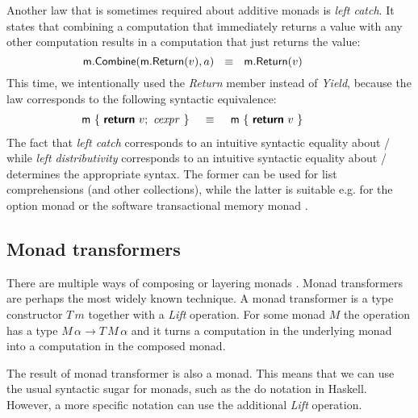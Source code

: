 \documentclass[runningheads,a4paper]{llncs}
\begin{document}
Another law that is sometimes required about additive monads is \emph{left catch}. It states that
combining a computation that immediately returns a value with any other computation results in 
a computation that just returns the value:
%
\begin{equation*}
\hspace{-3em}
\ident{m}.\ident{Combine}(\ident{m}.\ident{Return}(v), a)
~~\equiv~~
\ident{m}.\ident{Return}(v)
\end{equation*}
%
This time, we intentionally used the \emph{Return} member instead of \emph{Yield}, because the law
corresponds to the following syntactic equivalence:
%
\begin{equation*}
\hspace{-3em}
\begin{array}{l}
\ident{m}~\{~  \kvd{return}~v; ~ \cexpr~\}
\end{array}~~\equiv~~
\begin{array}{l}
\ident{m}~\{~  \kvd{return}~v~\}\\
\end{array}
\end{equation*}
%
The fact that \emph{left catch} corresponds to an intuitive syntactic equality about 
/ while \emph{left distributivity} corresponds to an intuitive syntactic equality
about / determines the appropriate syntax. The former can be used
for list comprehensions (and other collections), while the latter is suitable e.g. for the 
option monad or the software transactional memory monad \cite{stm}.

\subsection{Monad transformers}
\label{sec:laws-transf}

There are multiple ways of composing or layering monads \cite{monad-transformers,monad-compose,monads-layered}. 
Monad transformers are perhaps the most widely known technique. A monad transformer is a type 
constructor $T\,m$ together with a \emph{Lift} operation. For some monad $M$ the operation has 
a type $M\,\alpha \rightarrow T\,M\,\alpha$ and it turns a computation in the underlying monad 
into a computation in the composed monad.

The result of monad transformer is also a monad. This means that we can use the usual syntactic 
sugar for monads, such as the do notation in Haskell. However, a more specific notation can
use the additional \emph{Lift} operation.
\end{document}
